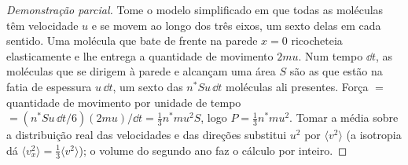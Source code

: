 \begin{proof}[Demonstração parcial]
Tome o modelo simplificado em que todas as moléculas têm velocidade $u$ e
se movem ao longo dos três eixos, um sexto delas em cada sentido. Uma
molécula que bate de frente na parede $x = 0$ ricocheteia elasticamente e
lhe entrega a quantidade de movimento $2mu$. Num tempo $\dd t$, as
moléculas que se dirigem à parede e alcançam uma área $S$ são as que estão
na fatia de espessura $u\,\dd t$, um sexto das $n^*Su\,\dd t$ moléculas ali
presentes. Força $= $ quantidade de movimento por unidade de tempo
$= (n^*Su\,\dd t/6)(2mu)/\dd t = \tfrac13 n^*mu^2S$, logo
$P = \tfrac13 n^*mu^2$. Tomar a média sobre a distribuição real das velocidades
e das direções substitui $u^2$ por $\langle v^2\rangle$ (a isotropia dá
$\langle v_x^2\rangle = \tfrac13\langle v^2\rangle$); o volume do segundo ano
faz o cálculo por inteiro.
\end{proof}

